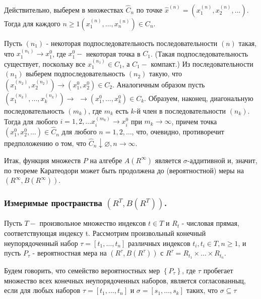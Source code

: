 Действительно, выберем в множествах $\widehat{C}_{n}$ по точке $\hat{x}^{(n)}=\left(x_{1}^{(n)}, x_{2}^{(n)}, \ldots\right)$. Тогда для каждого $n \geqslant 1\left(x_{1}^{(n)}, \ldots, x_{n}^{(n)}\right) \in C_{n}$.

Пусть $\left(n_{1}\right)$ - некоторая подпоследовательность последовательности $(n)$ такая, что $x_{1}^{\left(n_{1}\right)} \rightarrow x_{1}^{0}$, где $x_{1}^{0}-$ некоторая точка в $C_{1}$. (Такая подпоследовательность существует, поскольку все $x_{1}^{\left(n_{1}\right)} \in C_{1}$, а $C_{1}-$ компакт.) Из последовательности $\left(n_{1}\right)$ выберем подпоследовательность $\left(n_{2}\right)$ такую, что $\left(x_{1}^{\left(n_{2}\right)}, x_{2}^{\left(n_{2}\right)}\right) \rightarrow\left(x_{1}^{0}, x_{2}^{0}\right) \in C_{2}$. Аналогичным образом пусть $\left(x_{1}^{\left(n_{k}\right)}, \ldots, x_{k}^{\left(n_{k}\right)}\right) \rightarrow$ $\rightarrow\left(x_{1}^{0}, \ldots, x_{k}^{0}\right) \in C_{k}$. Образуем, наконец, диагональную последовательность $\left(m_{k}\right)$, где $m_{k}$ есть $k$-й член в последовательности $\left(n_{k}\right)$. Тогда для любого $i=1,2, \ldots x_{i}^{\left(m_{k}\right)} \rightarrow x_{i}^{0}$ при $m_{k} \rightarrow \infty$, причем точка $\left(x_{1}^{0}, x_{2}^{0}, \ldots\right) \in \widehat{C}_{n}$ для любого $n=1,2, \ldots$, что, очевидно, противоречит предположению о том, что $\widehat{C}_{n} \downarrow \varnothing, n \rightarrow \infty$.

Итак, функция множеств ${P}$ на алгебре ${A}\left(R^{\infty}\right)$ является $\sigma$-аддитивной и, значит, по теореме Каратеодори может быть продолжена до (вероятностной) меры на $\left(R^{\infty}, {B}\left(R^{\infty}\right)\right)$.

\subsubsection{Измеримые пространства $\left(R^{T}, {B}\left(R^{T}\right)\right)$.}
 Пусть $T-$ произвольное множество индексов $t \in T$ и $R_{t}$ - числовая прямая, соответствующая индексу t. Рассмотрим произвольный конечный неупорядоченный набор $\tau=\left[t_{1}, \ldots, t_{n}\right]$ различных индексов $t_{i}, t_{i} \in T, n \geqslant 1$, и пусть $P_{\tau}$ - вероятностная мера на $\left(R^{\tau}, {B}\left(R^{\tau}\right)\right)$ с $R^{\tau}=R_{t_{1}} \times \ldots \times R_{t_{n}}$.

Будем говорить, что семейство вероятностных мер $\left\{P_{\tau}\right\}$, где $\tau$ пробегает множество всех конечных неупорядоченных наборов, является согласованныц, если для любых наборов $\tau=\left[t_{1}, \ldots, t_{n}\right]$ и $\sigma=\left[s_{1}, \ldots, s_{k}\right]$ таких, что $\sigma \subseteq \tau$

